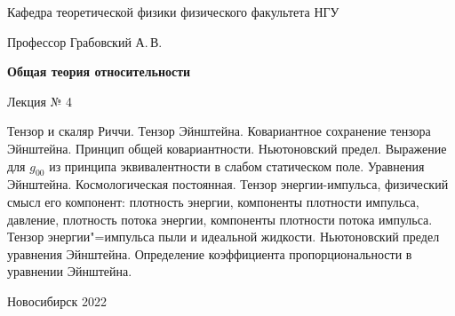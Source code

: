 \documentclass[12pt,pagesize,paper=192mm:108mm,landscape]{scrbook}
\begin{document}
\begin{titlepage}
\begin{center}
    Кафедра теоретической физики физического факультета НГУ

    \Large
    Профессор Грабовский А.\,В.

    \huge
    \textbf{Общая теория относительности}

    \Large
    Лекция № 4
    \vfill

    \normalsize
    \begin{minipage}{0.9\linewidth}
      Тензор и скаляр Риччи. Тензор Эйнштейна. Ковариантное сохранение
      тензора Эйнштейна. Принцип общей ковариантности. Ньютоновский
      предел. Выражение для $g_{00}$ из принципа эквивалентности в
      слабом статическом поле. Уравнения Эйнштейна. Космологическая
      постоянная. Тензор энергии-импульса, физический смысл его
      компонент: плотность энергии, компоненты плотности импульса,
      давление, плотность потока энергии, компоненты плотности потока
      импульса. Тензор энергии"=импульса пыли и идеальной
      жидкости. Ньютоновский предел уравнения Эйнштейна. Определение
      коэффициента пропорциональности в уравнении Эйнштейна.
     \end{minipage}
    \vfill

    \normalsize \ccbysa\hspace{0.5em}  Новосибирск 2022
  \end{center}
\end{titlepage}
\end{document}
